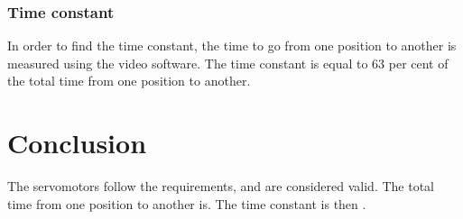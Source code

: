 \subsubsection*{Time constant}
 In order to find the time constant, the time to go from one position to another is measured using the video software. The time constant is equal to 63 per cent of the total time from one position to another. 
 
 
 

	\section*{Conclusion}
The servomotors follow the requirements, and are considered valid. The total time from one position to another is. The time constant is then .





